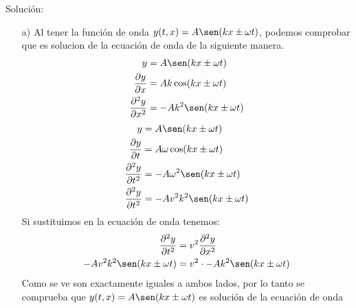 \documentclass[letterpaper,12pt,addpoints]{exam}
\begin{document}
{\color{ceruleanblue}
Solución:\\
\begin{enumerate}
\item[a)] Al tener la función de onda $y(t,x) = A \sen(kx \pm \omega t)$, podemos comprobar que es solucion de la ecuación de onda de la siguiente manera.
\begin{align*}
y &= A \sen(kx \pm \omega t)\\
\frac{\partial y}{\partial x} &= Ak\cos(kx \pm \omega t)\\
\frac{\partial^2 y}{\partial x^2} &= -Ak^2\sen(kx \pm \omega t)
\end{align*}
\begin{align*}
y &= A \sen(kx \pm \omega t)\\
\frac{\partial y}{\partial t} &= A\omega \cos(kx \pm \omega t)\\
\frac{\partial^2 y}{\partial t^2} &= -A\omega^2\sen(kx \pm \omega t)\\
\frac{\partial^2 y}{\partial t^2} &= -Av^2k^2\sen(kx \pm \omega t)\\
\end{align*}
Si sustituimos en la ecuación de onda tenemos:
\begin{align*}
\frac{\partial^2 y}{\partial t^2} &= v^2 \frac{\partial^2 y}{\partial x^2} \\
-Av^2k^2\sen(kx \pm \omega t) &= v^2 \cdot -Ak^2\sen(kx \pm \omega t)
\end{align*}
Como se ve son exactamente iguales a ambos lados, por lo tanto se comprueba que $y(t,x) = A \sen(kx \pm \omega t)$ es solución de la ecuación de onda
\end{enumerate}
}
\end{document}
